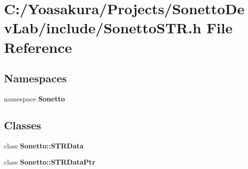 \section{C:/Yoasakura/Projects/SonettoDevLab/include/SonettoSTR.h File Reference}
\label{_sonetto_s_t_r_8h}
\subsection*{Namespaces}
\begin{CompactItemize}
\item 
namespace {\bf Sonetto}
\end{CompactItemize}
\subsection*{Classes}
\begin{CompactItemize}
\item 
class {\bf Sonetto::STRData}
\item 
class {\bf Sonetto::STRDataPtr}
\end{CompactItemize}
